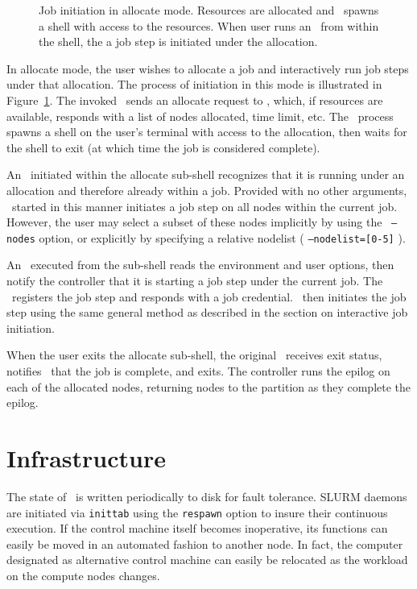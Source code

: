 \begin{figure}[tb]
\centerline{ }
\caption{\small Job initiation in allocate mode. Resources are allocated and
         \srun\ spawns a shell with access to the resources. When user runs 
	 an \srun\ from within the shell, the a job step is initiated under
	 the allocation.}
\label{init-allocate}
\end{figure}

In allocate mode, the user wishes to allocate a job and interactively run
job steps under that allocation. The process of initiation in this mode
is illustrated in Figure~\ref{init-allocate}. The invoked \srun\ sends
an allocate request to \slurmctld , which, if resources are available,
responds with a list of nodes allocated, time limit, etc. The \srun\
process spawns a shell on the user's terminal with access to the
allocation, then waits for the shell to exit (at which time the job
is considered complete). 

An \srun\ initiated within the allocate sub-shell recognizes that it
is running under an allocation and therefore already within a job. Provided
with no other arguments, \srun\ started in this manner initiates a job
step on all nodes within the current job. However, the user may select
a subset of these nodes implicitly by using the \srun\ {\tt --nodes}  
option, or explicitly by specifying a relative nodelist 
( {\tt --nodelist=[0-5]} ). 

An \srun\ executed from the sub-shell reads the environment and
user options, then notify the controller that it is starting a job step
under the current job. The \slurmctld\ registers the job step and responds
with a job credential. \srun\ then initiates the job step using the same
general method as described in the section on interactive job initiation.

When the user exits the allocate sub-shell, the original \srun\ receives
exit status, notifies \slurmctld\ that the job is complete, and exits. 
The controller runs the epilog on each of the allocated nodes, returning
nodes to the partition as they complete the epilog.

\section{Infrastructure}

The state of \slurmctld\ is written periodically to disk for fault tolerance. 
SLURM daemons are initiated via {\tt inittab} using 
the {\tt respawn} option to insure their continuous execution. 
If the control machine itself becomes inoperative, its functions can
easily be moved in an automated fashion to another node. In fact, the
computer designated as alternative control machine can easily be relocated as
the workload on the compute nodes changes. 

